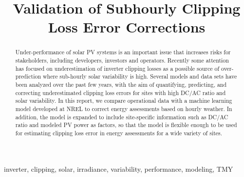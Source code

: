 \documentclass[conference]{IEEEtran}
\begin{document}
\title{Validation of Subhourly Clipping Loss Error Corrections}

\author{
    }

\maketitle

\begin{abstract}
Under-performance of solar PV systems is an important issue that increases risks for stakeholders, including developers, investors and operators. Recently some attention has focused on underestimation of inverter clipping losses as a possible source of over-prediction where sub-hourly solar variability is high. Several models and data sets have been analyzed over the past few years, with the aim of quantifying, predicting, and correcting underestimated clipping loss errors for sites with high DC/AC ratio and solar variability. In this report, we compare operational data with a machine learning model developed at NREL to correct energy assessments based on hourly weather. In addition, the model is expanded to include site-specific information such as DC/AC ratio and modeled PV power as factors, so that the model is flexible enough to be used for estimating clipping loss error in energy assessments for a wide variety of sites. 
\end{abstract}

\begin{IEEEkeywords}
inverter, clipping, solar, irradiance, variability, performance, modeling, TMY
\end{IEEEkeywords}
\end{document}

